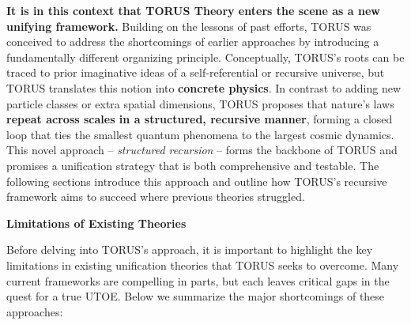 \documentclass[
]{article}
\begin{document}
\textbf{It is in this context that TORUS Theory enters the scene as a
new unifying framework.} Building on the lessons of past efforts, TORUS
was conceived to address the shortcomings of earlier approaches by
introducing a fundamentally different organizing principle.
Conceptually, TORUS's roots can be traced to prior imaginative ideas of
a self-referential or recursive universe, but TORUS translates this
notion into \textbf{concrete physics}. In contrast to adding new
particle classes or extra spatial dimensions, TORUS proposes that
nature's laws \textbf{repeat across scales in a structured, recursive
manner}, forming a closed loop that ties the smallest quantum phenomena
to the largest cosmic dynamics. This novel approach -- \emph{structured
recursion} -- forms the backbone of TORUS and promises a unification
strategy that is both comprehensive and testable. The following sections
introduce this approach and outline how TORUS's recursive framework aims
to succeed where previous theories struggled.

\textbf{Limitations of Existing Theories}

Before delving into TORUS's approach, it is important to highlight the
key limitations in existing unification theories that TORUS seeks to
overcome. Many current frameworks are compelling in parts, but each
leaves critical gaps in the quest for a true UTOE. Below we summarize
the major shortcomings of these approaches:
\end{document}
